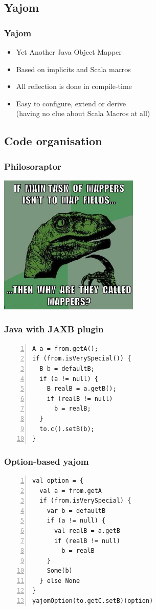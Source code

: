 \documentclass[14pt]{beamer}
\begin{document}
\subsection{Yajom}
\frame
{\frametitle{Yajom}
\begin{itemize}
  \item Yet Another Java Object Mapper
  \item Based on implicits and Scala macros
  \item All reflection is done in compile-time
  \item Easy to configure, extend or derive \\ (having no clue about Scala Macros at all)
\end{itemize}
}

\subsection{Code organisation}
\frame
{\frametitle{Philosoraptor}
  \begin{center}
    \includegraphics[width=0.5\textwidth]{phil.png}
  \end{center}
}

\begin{frame}[t,fragile]
\frametitle{Java with JAXB plugin}
\begin{lstlisting}[numbers=left,xleftmargin=20pt]
A a = from.getA();
if (from.isVerySpecial()) {
  B b = defaultB;
  if (a != null) {
    B realB = a.getB();
    if (realB != null)
      b = realB; 
  } 
  to.c().setB(b);
}
\end{lstlisting}
\end{frame}

\begin{frame}[t,fragile]
\frametitle{Option-based yajom}
\begin{lstlisting}[numbers=left,xleftmargin=20pt]
val option = {
  val a = from.getA
  if (from.isVerySpecial) {
    var b = defaultB
    if (a != null) {
      val realB = a.getB
      if (realB != null)
        b = realB
    }
    Some(b)
  } else None
}
yajomOption(to.getC.setB)(option)
\end{lstlisting}
\end{frame}
\end{document}
